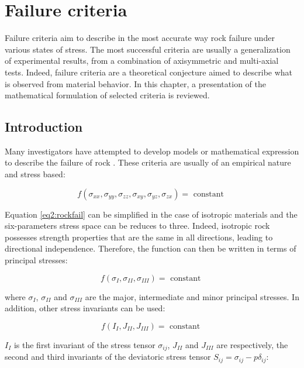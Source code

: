 \chapter{Failure criteria}\label{ch2:title}

Failure criteria aim to describe in the most accurate way rock failure under various states of stress. The most successful criteria are usually a generalization of experimental results, from a combination of axisymmetric and multi-axial tests. Indeed, failure criteria are a theoretical conjecture aimed to describe what is observed from material behavior. In this chapter, a presentation of the mathematical formulation of selected criteria is reviewed.

\section{Introduction}\label{ch2:background}

Many investigators have attempted to develop models or mathematical expression to describe the failure of rock \cite{Labuz2018}. These criteria are usually of an empirical nature and stress based: 

\begin{equation}\label{eq2:rockfail}
    f\left(\sigma_{x x}, \sigma_{y y}, \sigma_{z z}, \sigma_{x y}, \sigma_{y z}, \sigma_{z x}\right)=\text { constant }
\end{equation}

Equation \ref{eq2:rockfail} can be simplified in the case of isotropic materials and the six-parameters stress space can be reduces to three. Indeed, isotropic rock possesses strength properties that are the same in all directions, leading to directional independence. Therefore, the function can then be written in terms of principal stresses: 

\begin{equation}\label{eq2:fsigconst}
    f\left(\sigma_{I}, \sigma_{II}, \sigma_{III} \right)=\text { constant }
\end{equation}

where $\sigma_{I}$, $\sigma_{II}$ and $\sigma_{III}$ are the major, intermediate and minor principal stresses. In addition, other stress invariants can be used:

\begin{equation}\label{eq2:fijjconst}
    f\left(I_{I}, J_{II}, J_{III} \right)=\text { constant }
\end{equation}

$I_{I}$ is the first invariant of the stress tensor $\sigma_{ij}$, $J_{II}$ and $J_{III}$ are respectively, the second and third invariants of the deviatoric stress tensor $S_{ij}=\sigma_{ij}-p\delta_{ij}$: 

